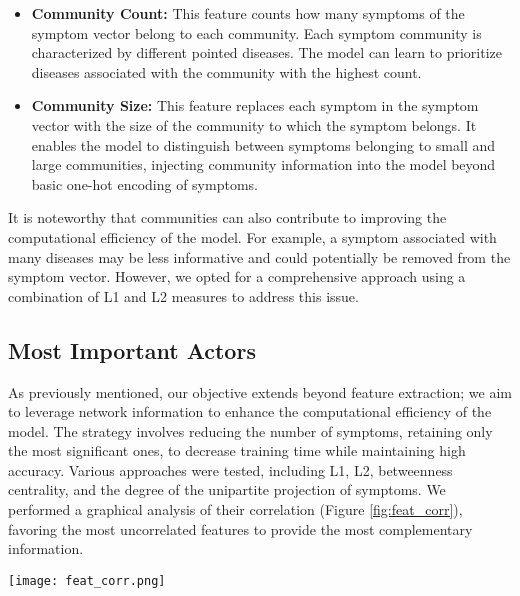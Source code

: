 \begin{itemize}
    \setlength\itemsep{1em} %

    \item \textbf{Community Count:} This feature counts how many symptoms of the symptom vector belong to each community.
          Each symptom community is characterized by different pointed diseases. The model can learn to prioritize
          diseases associated with the community with the highest count.

    \item \textbf{Community Size:} This feature replaces each symptom in the symptom vector with the size of the
          community to which the symptom belongs. It enables the model to distinguish between symptoms belonging to small and
          large communities, injecting community information into the model beyond basic one-hot encoding of symptoms.
\end{itemize}
\noindent
\vspace{0.4cm}
It is noteworthy that communities can also contribute to improving the computational efficiency of the model.
For example, a symptom associated with many diseases may be less informative and could potentially be removed from the
symptom vector. However, we opted for a comprehensive approach using a combination of L1 and L2 measures to address this issue.


\subsection{Most Important Actors}
\label{subsec:most_important_actors}

As previously mentioned, our objective extends beyond feature extraction; we aim to leverage network information to
enhance the computational efficiency of the model. The strategy involves reducing the number of symptoms,
retaining only the most significant ones, to decrease training time while maintaining high accuracy.
Various approaches were tested, including L1, L2, betweenness centrality, and the degree of the unipartite projection
of symptoms. We performed a graphical analysis of their correlation (Figure \ref{fig:feat_corr}), favoring the
most uncorrelated features to provide the most complementary information.

\begin{figure*}[!t]
    \centering
    \texttt{[image: feat\_corr.png]}
    \caption{Correlation between features}
    \label{fig:feat_corr}
\end{figure*}

